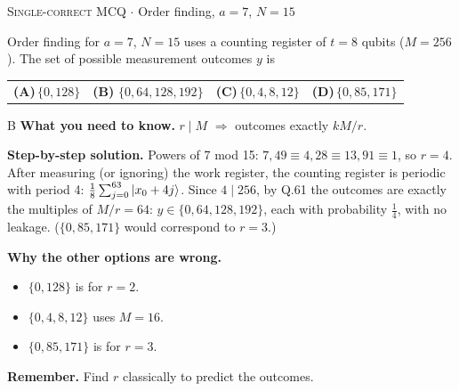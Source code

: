 \documentclass[11pt,a4paper]{article}
\newcommand{\optlabel}[1]{\textbf{(#1)}}
\newcommand{\correctlabel}[1]{\textcolor{okgreen}{\textbf{(#1)}\,\ding{51}}}
\newenvironment{qitem}[1]{\begin{list}{}{\setlength{\leftmargin}{3.3em}\setlength{\labelwidth}{3.1em}%
  \setlength{\labelsep}{0.2em}\setlength{\topsep}{3pt}\setlength{\parsep}{3pt}}\item[\textbf{Q.#1}\hfill]}{\end{list}}
\newcommand{\qsep}{\par\vspace{2pt}{\color{black!15}\hrule}\vspace{4pt}}
\newcommand{\qmeta}[2]{{\footnotesize\color{black!60}\textsc{#1} \;$\cdot$\; #2}\par}
\begin{document}
\begin{qitem}{69}
\qmeta{Single-correct MCQ}{Order finding, $a = 7$, $N = 15$}
Order finding for $a = 7$, $N = 15$ uses a counting register of $t = 8$ qubits ($M = 256$). The set of possible
measurement outcomes $y$ is
\par\smallskip\noindent\begin{tabularx}{\linewidth}{@{}*{4}{L}@{}}
\optlabel{A}\,$\{0, 128\}$ & \correctlabel{B}\,$\{0, 64, 128, 192\}$ & \optlabel{C}\,$\{0, 4, 8, 12\}$ & \optlabel{D}\,$\{0, 85, 171\}$
\end{tabularx}
\end{qitem}
\begin{solbox}{B}
\textbf{\color{brand}What you need to know.} $r \mid M$ $\Rightarrow$ outcomes exactly $kM/r$.

\textbf{\color{brand}Step-by-step solution.} Powers of 7 mod 15: $7, 49 \equiv 4, 28 \equiv 13, 91 \equiv 1$, so $r = 4$. After measuring (or ignoring) the work register,
the counting register is periodic with period 4: $\frac{1}{8}\sum_{j=0}^{63}\ket{x_0 + 4j}$. Since $4 \mid 256$, by Q.61 the
outcomes are exactly the multiples of $M/r = 64$: $y \in \{0, 64, 128, 192\}$, each with probability $\frac14$, with no
leakage. ($\{0,85,171\}$ would correspond to $r = 3$.)

\textbf{\color{brand}Why the other options are wrong.}
\begin{itemize}[leftmargin=2.4em, itemsep=1pt, topsep=2pt]
\item[\textbf{(A)}] $\{0, 128\}$ is for $r = 2$.
\item[\textbf{(C)}] $\{0,4,8,12\}$ uses $M = 16$.
\item[\textbf{(D)}] $\{0, 85, 171\}$ is for $r = 3$.
\end{itemize}
\textbf{\color{brand}Remember.} Find $r$ classically to predict the outcomes.
\end{solbox}
\qsep
\end{document}
